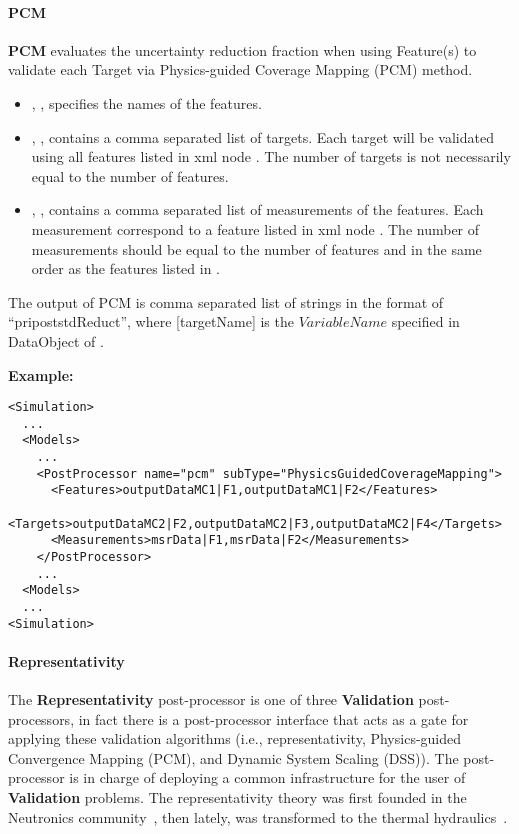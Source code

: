 \paragraph{PCM}
\textbf{PCM} evaluates the uncertainty reduction fraction when using Feature(s) to validate each Target via Physics-guided Coverage Mapping (PCM) method.

%
%

\begin{itemize}
  \item {}, , specifies the names of the features.
  \item {}, , contains a comma separated list of
     targets. \nb Each target will be validated using all features listed in xml node . The
    number of targets is not necessarily equal to the number of features.
  \item {}, , contains a comma separated list of
     measurements of the features. \nb Each measurement correspond to a feature listed in xml node . The
    number of measurements should be equal to the number of features and in the same order as the features listed in .
\end{itemize}

The output of PCM is comma separated list of strings in the format of ``pri\textunderscore post\textunderscore stdReduct\textunderscore [targetName]'',
where [targetName] is the $VariableName$ specified in DataObject of .


\textbf{Example:}
\begin{lstlisting}[style=XML,morekeywords={subType}]
<Simulation>
  ...
  <Models>
    ...
    <PostProcessor name="pcm" subType="PhysicsGuidedCoverageMapping">
      <Features>outputDataMC1|F1,outputDataMC1|F2</Features>
      <Targets>outputDataMC2|F2,outputDataMC2|F3,outputDataMC2|F4</Targets>
      <Measurements>msrData|F1,msrData|F2</Measurements>
    </PostProcessor>
    ...
  <Models>
  ...
<Simulation>
\end{lstlisting}


\paragraph{Representativity}
The \textbf{Representativity} post-processor is one of three \textbf{Validation} post-processors, in fact there is a
post-processor interface that acts as a gate for applying these validation algorithms
(i.e., representativity, Physics-guided Convergence Mapping (PCM), and Dynamic System Scaling (DSS)).
The post-processor is in charge of deploying a common infrastructure for the user of  \textbf{Validation} problems.
The representativity theory was first founded in the Neutronics community~\cite{Gandini, palmiotti1, palmiotti2}, then lately, was transformed to the thermal hydraulics~\cite{Epiney1, Epiney2}.

